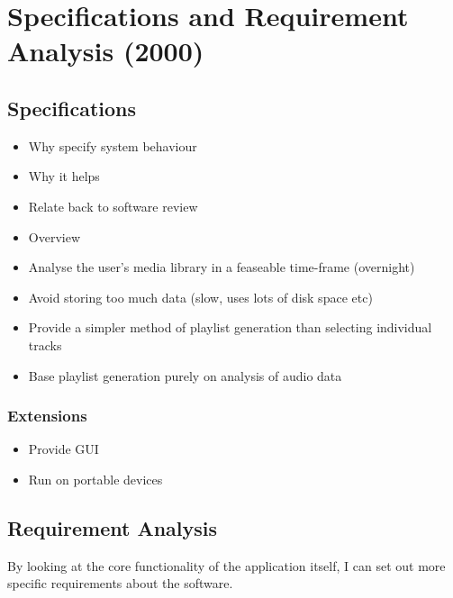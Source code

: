 %
%
\chapter{Specifications and Requirement Analysis (2000)}
\section{Specifications}
\begin{itemize}
	\item Why specify system behaviour
	\item Why it helps
	\item Relate back to software review
	\item Overview
\end{itemize}
\begin{itemize}
	\item Analyse the user's media library in a feaseable time-frame (overnight)
	\item Avoid storing too much data (slow, uses lots of disk space etc)
	\item Provide a simpler method of playlist generation than selecting individual tracks
	\item Base playlist generation purely on analysis of audio data
\end{itemize}
\subsection{Extensions}
\begin{itemize}
	\item Provide GUI
	\item Run on portable devices
\end{itemize}
\section{Requirement Analysis}
By looking at the core functionality of the application itself,
I can set out more specific requirements about the software.

